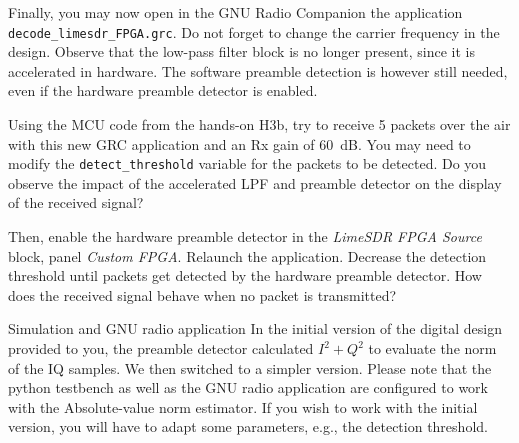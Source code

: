 Finally, you may now open in the GNU Radio Companion the application \texttt{decode\_limesdr\_FPGA.grc}. Do not forget to change the carrier frequency in the design. Observe that the low-pass filter block is no longer present, since it is accelerated in hardware. The software preamble detection is however still needed, even if the hardware preamble detector is enabled.

Using the MCU code from the hands-on H3b, try to receive 5 packets over the air with this new GRC application and an Rx gain of 60~dB. You may need to modify the \texttt{detect\_threshold} variable for the packets to be detected. Do you observe the impact of the accelerated LPF and preamble detector on the display of the received signal?

Then, enable the hardware preamble detector in the \textit{LimeSDR FPGA Source} block, panel \textit{Custom FPGA}. Relaunch the application. Decrease the detection threshold until packets get detected by the hardware preamble detector. How does the received signal behave when no packet is transmitted?

\begin{bclogo}[couleur = gray!20, arrondi = 0.2, logo=\bcinfo]{Simulation and GNU radio application}
In the initial version of the digital design provided to you, the preamble detector calculated $I^2+Q^2$ to evaluate the norm of the IQ samples. We then switched to a simpler version. Please note that the python testbench as well as the GNU radio application are configured to work with the Absolute-value norm estimator. If you wish to work with the initial version, you will have to adapt some parameters, e.g., the detection threshold.
\end{bclogo}


